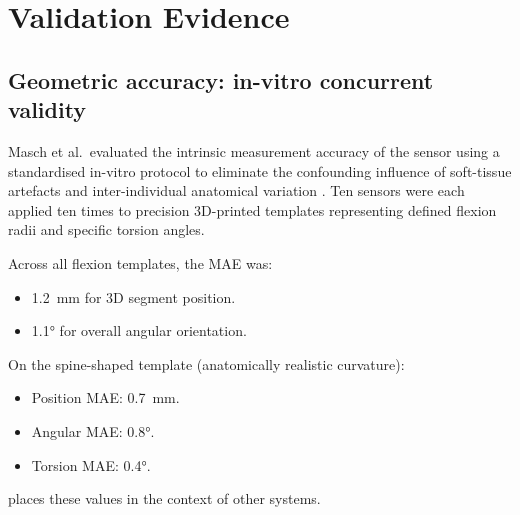 \section{Validation Evidence}

\subsection{Geometric accuracy: in-vitro concurrent validity}

Masch et al.\ evaluated the intrinsic measurement accuracy of the sensor using a
standardised in-vitro protocol to eliminate the confounding influence of soft-tissue
artefacts and inter-individual anatomical variation \cite{walkling2025}.
Ten sensors were each applied ten times to precision 3D-printed templates representing
defined flexion radii and specific torsion angles.

Across all flexion templates, the \ac{MAE} was:

\begin{itemize}
	\item \SI{1.2}{\milli\metre} for 3D segment position.
	\item \ang{1.1} for overall angular orientation.
\end{itemize}

On the spine-shaped template (anatomically realistic curvature):

\begin{itemize}
	\item Position \acs{MAE}: \SI{0.7}{\milli\metre}.
	\item Angular \acs{MAE}: \ang{0.8}.
	\item Torsion \acs{MAE}: \ang{0.4}.
\end{itemize}

 places these values in the context of other systems.

